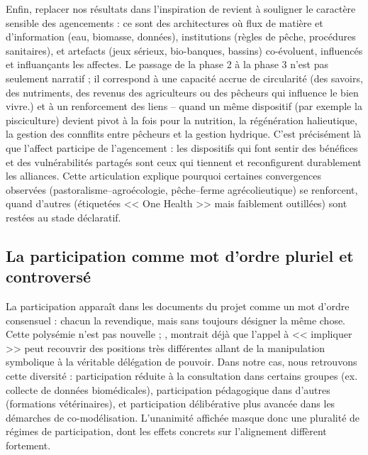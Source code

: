 \documentclass{article}
\begin{document}
Enfin, replacer nos résultats dans l’inspiration de \textcite{hertz_knowledge_2025} revient à souligner le caractère sensible des agencements : ce sont des architectures où flux de matière et d’information (eau, biomasse, données), institutions (règles de pêche, procédures sanitaires), et artefacts (jeux sérieux, bio-banques, bassins) co-évoluent, influencés et influançants les affectes. Le passage de la phase 2 à la phase 3 n’est pas seulement narratif ; il correspond à une capacité accrue de circularité (des savoirs, des nutriments, des revenus des agriculteurs ou des pêcheurs qui influence le bien vivre.) et à un renforcement des liens -- quand un même dispositif (par exemple la pisciculture) devient pivot à la fois pour la nutrition, la régénération halieutique, la gestion des connflits entre pêcheurs et la gestion hydrique. C’est précisément là que l’affect participe de l’agencement : les dispositifs qui font sentir des bénéfices et des vulnérabilités partagés sont ceux qui tiennent et reconfigurent durablement les alliances. Cette articulation explique pourquoi certaines convergences observées (pastoralisme–agroécologie, pêche–ferme agrécolieutique) se renforcent, quand d’autres (étiquetées << One Health >> mais faiblement outillées) sont restées au stade déclaratif.


\subsection{La participation comme mot d’ordre pluriel et controversé}

La participation apparaît dans les documents du projet comme un mot d’ordre consensuel : chacun la revendique, mais sans toujours désigner la même chose. Cette polysémie n’est pas nouvelle ; \textcite{arnstein_ladder_1969}, montrait déjà que l’appel à << impliquer >> peut recouvrir des positions très différentes allant de la manipulation symbolique à la véritable délégation de pouvoir. Dans notre cas, nous retrouvons cette diversité : participation réduite à la consultation dans certains groupes (ex. collecte de données biomédicales), participation pédagogique dans d’autres (formations vétérinaires), et participation délibérative plus avancée dans les démarches de co-modélisation. L’unanimité affichée masque donc une pluralité de régimes de participation, dont les effets concrets sur l’alignement diffèrent fortement.
\end{document}
